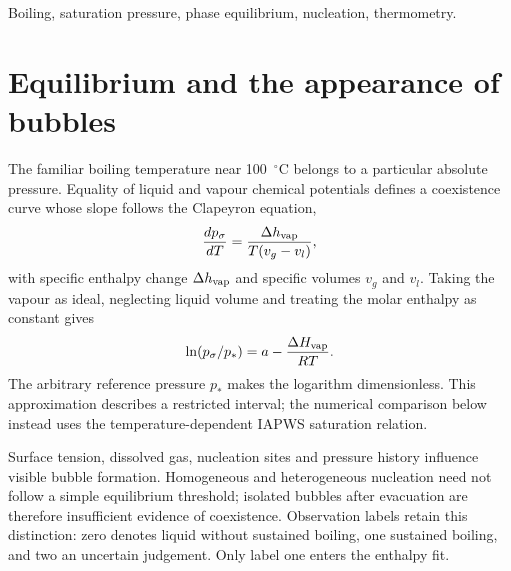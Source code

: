 \begin{abstract}
Fifteen paired pressure--temperature observations in the data distinguish a visible boiling threshold from an equilibrium coexistence curve. The five sustained-boiling observations have an RMS deviation of 0.25~K from IAPWS saturation, while liquid-labelled observations lie about 5.0~K below it. A Clausius--Clapeyron fit gives an interval-dependent apparent enthalpy of 42.5~kJ/mol. Conditional uncertainty, instrument range and comparison with Martian pressure delimit the inference: the lowest example pressure remains 7.92 times the planetary reference.
\end{abstract}
\begin{IEEEkeywords}
Boiling, saturation pressure, phase equilibrium, nucleation, thermometry.
\end{IEEEkeywords}

\section{Equilibrium and the appearance of bubbles}
The familiar boiling temperature near 100~$^\circ$C belongs to a particular absolute pressure. Equality of liquid and vapour chemical potentials defines a coexistence curve whose slope follows the Clapeyron equation,
\begin{equation}
 \frac{dp_\sigma}{dT}=\frac{\Delta h_{\rm vap}}{T(v_g-v_l)},
 \label{eq:pressure-boiling-clapeyron}
\end{equation}
with specific enthalpy change $\Delta h_{\rm vap}$ and specific volumes $v_g$ and $v_l$. Taking the vapour as ideal, neglecting liquid volume and treating the molar enthalpy as constant gives
\begin{equation}
 \ln(p_\sigma/p_*)=a-\frac{\Delta H_{\rm vap}}{RT}.
 \label{eq:pressure-boiling-log}
\end{equation}
The arbitrary reference pressure $p_*$ makes the logarithm dimensionless. This approximation describes a restricted interval; the numerical comparison below instead uses the temperature-dependent IAPWS saturation relation\cite{iapws1992}.

Surface tension, dissolved gas, nucleation sites and pressure history influence visible bubble formation. Homogeneous and heterogeneous nucleation need not follow a simple equilibrium threshold\cite{blander1975}; isolated bubbles after evacuation are therefore insufficient evidence of coexistence. Observation labels retain this distinction: zero denotes liquid without sustained boiling, one sustained boiling, and two an uncertain judgement. Only label one enters the enthalpy fit.

